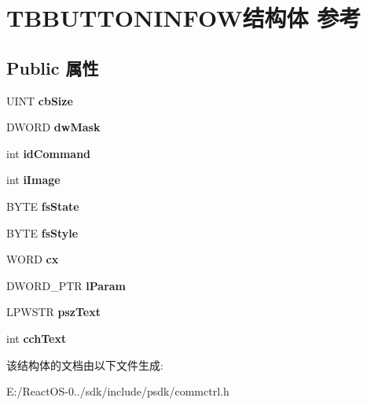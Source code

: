 \hypertarget{struct_t_b_b_u_t_t_o_n_i_n_f_o_w}{}\section{T\+B\+B\+U\+T\+T\+O\+N\+I\+N\+F\+O\+W结构体 参考}
\label{struct_t_b_b_u_t_t_o_n_i_n_f_o_w}
\subsection*{Public 属性}
\begin{DoxyCompactItemize}
\item 
\mbox{\label{struct_t_b_b_u_t_t_o_n_i_n_f_o_w_ad14319ed72a633fc8f244086dcb8e791}} 
U\+I\+NT {\bfseries cb\+Size}
\item 
\mbox{\label{struct_t_b_b_u_t_t_o_n_i_n_f_o_w_a0556f1b1910a4aa976e77caf332a3c15}} 
D\+W\+O\+RD {\bfseries dw\+Mask}
\item 
\mbox{\label{struct_t_b_b_u_t_t_o_n_i_n_f_o_w_a6d86f5a04a66b1d7802553b9aa362bff}} 
int {\bfseries id\+Command}
\item 
\mbox{\label{struct_t_b_b_u_t_t_o_n_i_n_f_o_w_a965fcf880243b629bb18bf450dd0c626}} 
int {\bfseries i\+Image}
\item 
\mbox{\label{struct_t_b_b_u_t_t_o_n_i_n_f_o_w_af37851b93610ddaa71925eb7e5415312}} 
B\+Y\+TE {\bfseries fs\+State}
\item 
\mbox{\label{struct_t_b_b_u_t_t_o_n_i_n_f_o_w_a1e8c9aa43a02b0f64454fb956f798e62}} 
B\+Y\+TE {\bfseries fs\+Style}
\item 
\mbox{\label{struct_t_b_b_u_t_t_o_n_i_n_f_o_w_ab2d4c53b428c6865df5634d432681fb1}} 
W\+O\+RD {\bfseries cx}
\item 
\mbox{\label{struct_t_b_b_u_t_t_o_n_i_n_f_o_w_a21eecfa442001a5dd5e9d196659ebb6c}} 
D\+W\+O\+R\+D\+\_\+\+P\+TR {\bfseries l\+Param}
\item 
\mbox{\label{struct_t_b_b_u_t_t_o_n_i_n_f_o_w_a05bc2c202d929f50eba70c20de992b38}} 
L\+P\+W\+S\+TR {\bfseries psz\+Text}
\item 
\mbox{\label{struct_t_b_b_u_t_t_o_n_i_n_f_o_w_a9cf3d33ffd8a9272de39dbe16842fc78}} 
int {\bfseries cch\+Text}
\end{DoxyCompactItemize}


该结构体的文档由以下文件生成\+:\begin{DoxyCompactItemize}
\item 
E\+:/\+React\+O\+S-\/0../sdk/include/psdk/commctrl.\+h\end{DoxyCompactItemize}
